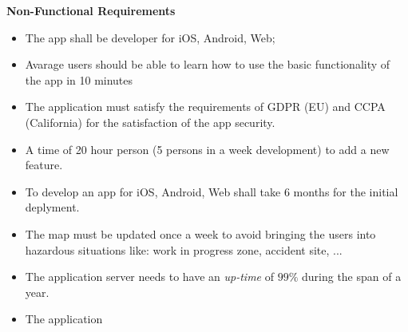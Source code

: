 \documentclass[12pt]{article}
\begin{document}
\textbf{Non-Functional Requirements}
\begin{itemize}
  \item The app shall be developer for iOS, Android, Web;
  \item Avarage users should be able to learn how to use the basic functionality of the app in 10 minutes
  \item The application must satisfy the requirements of GDPR (EU) and CCPA (California) for the satisfaction of the app security.
  \item A time of 20 hour person (5 persons in a week development) to add a new feature.
  \item To develop an app for iOS, Android, Web shall take 6 months for the initial deplyment.
  \item The map must be updated once a week to avoid bringing the users into hazardous situations like: work in progress zone, accident site, ...
  \item The application server needs to have an \emph{up-time} of $99\%$ during the span of a year.
  \item The application 
\end{itemize}






\newpage
\end{document}
